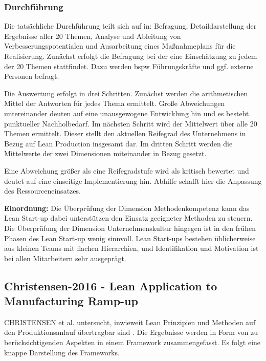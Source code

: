 \subsubsection{Durchführung}
Die tatsächliche Durchführung teilt sich auf in: Befragung, Detaildarstellung der Ergebnisse aller 20 Themen, Analyse und Ableitung von Verbesserungspotentialen und Ausarbeitung eines Maßnahmeplans für die Realisierung. 
%
Zunächst erfolgt die Befragung bei der eine Einschätzung zu jedem der 20 Themen stattfindet. Dazu werden \gls{bspw} Führungskräfte und ggf. externe Personen befragt. 

Die Auswertung erfolgt in drei Schritten. Zunächst werden die arithmetischen Mittel der Antworten für jedes Thema ermittelt. Große Abweichungen untereinander deuten auf eine unausgewogene Entwicklung hin und es besteht punktueller Nachholbedarf. Im nächsten Schritt wird der Mittelwert über alle 20 Themen ermittelt. Dieser stellt den aktuellen Reifegrad des Unternehmens in Bezug auf Lean Production insgesamt dar. Im dritten Schritt werden die Mittelwerte der zwei Dimensionen miteinander in Bezug gesetzt. %

Eine Abweichung größer als eine Reifegradstufe wird als kritisch bewertet und deutet auf eine einseitige Implementierung hin. Abhilfe schafft hier die Anpassung des Ressourceneinsatzes. 

\textbf{Einordnung:} 
Die Überprüfung der Dimension Methodenkompetenz kann das Lean Start-up dabei unterstützen den Einsatz geeigneter Methoden zu steuern. 
Die Überprüfung der Dimension Unternehmenskultur hingegen ist in den frühen Phasen des Lean Start-up wenig sinnvoll. Lean Start-ups bestehen üblicherweise aus kleinen Teams mit flachen Hierarchien, und Identifikation und Motivation ist bei allen Mitarbeitern sehr ausgeprägt.

\subsection*{Christensen-2016 - Lean Application to Manufacturing Ramp-up}\label{sec:christensen}
CHRISTENSEN et al. untersucht, inwieweit Lean Prinzipien und Methoden auf den Produktionsanlauf übertragbar sind \cite{Christensen2016}. 
Die Ergebnisse werden in Form von zu berücksichtigenden Aspekten in einem Framework zusammengefasst. Es folgt eine knappe Darstellung des Frameworks. 


